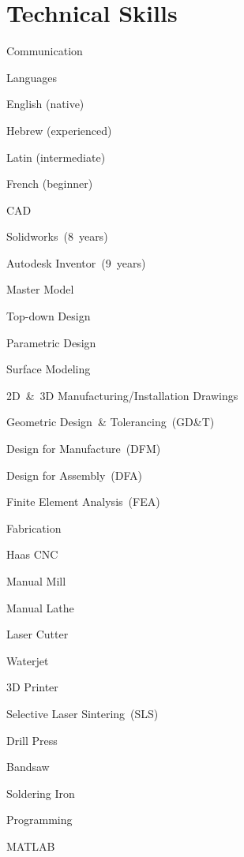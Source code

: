 \documentclass{resume}
\begin{document}
\section{Technical Skills}
\begin{skills}{Communication}
  \begin{groupitem}{Languages}
    \item English (native)
    \item Hebrew (experienced)
    \item Latin (intermediate)
    \item French (beginner)
  \end{groupitem}
  \begin{groupitem}{CAD}
    \item Solidworks~(8~years)
    \item Autodesk Inventor~(9~years)
    \item Master Model
    \item Top-down Design
    \item Parametric Design
    \item Surface Modeling
    \item 2D~\&~3D Manufacturing/Installation Drawings
    \item Geometric Design~\& Tolerancing~(GD\&T)
    \item Design for Manufacture~(DFM)
    \item Design for Assembly~(DFA)
    \item Finite Element Analysis~(FEA)
  \end{groupitem}
  \begin{groupitem}{Fabrication}
    \item Haas CNC
    \item Manual Mill
    \item Manual Lathe
    \item Laser Cutter
    \item Waterjet
    \item 3D Printer
    \item Selective Laser Sintering~(SLS)
    \item Drill Press
    \item Bandsaw
    \item Soldering Iron
  \end{groupitem}
  \begin{groupitem}{Programming}
    \item MATLAB

\end{groupitem}
\end{skills}
\end{document}
